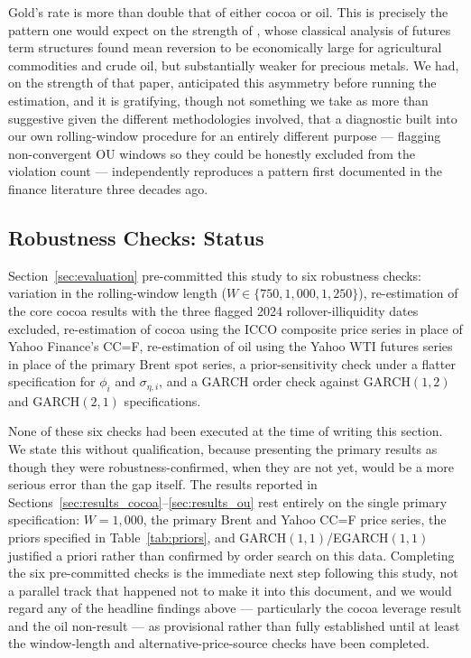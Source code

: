 \documentclass[preprint,12pt,authoryear]{elsarticle}
\begin{document}
Gold's rate is more than double that of either cocoa or oil. This is precisely the pattern one would expect on the strength of \citet{bessembinderetal1995}, whose classical analysis of futures term structures found mean reversion to be economically large for agricultural commodities and crude oil, but substantially weaker for precious metals. We had, on the strength of that paper, anticipated this asymmetry before running the estimation, and it is gratifying, though not something we take as more than suggestive given the different methodologies involved, that a diagnostic built into our own rolling-window procedure for an entirely different purpose --- flagging non-convergent OU windows so they could be honestly excluded from the violation count --- independently reproduces a pattern first documented in the finance literature three decades ago.

\subsection{Robustness Checks: Status}
\label{sec:robustness_status}

Section~\ref{sec:evaluation} pre-committed this study to six robustness checks: variation in the rolling-window length ($W \in \{750, 1{,}000, 1{,}250\}$), re-estimation of the core cocoa results with the three flagged 2024 rollover-illiquidity dates excluded, re-estimation of cocoa using the ICCO composite price series in place of Yahoo Finance's CC=F, re-estimation of oil using the Yahoo WTI futures series in place of the primary Brent spot series, a prior-sensitivity check under a flatter specification for $\phi_i$ and $\sigma_{\eta,i}$, and a GARCH order check against GARCH$(1,2)$ and GARCH$(2,1)$ specifications.

None of these six checks had been executed at the time of writing this section. We state this without qualification, because presenting the primary results as though they were robustness-confirmed, when they are not yet, would be a more serious error than the gap itself. The results reported in Sections~\ref{sec:results_cocoa}--\ref{sec:results_ou} rest entirely on the single primary specification: $W=1{,}000$, the primary Brent and Yahoo CC=F price series, the priors specified in Table~\ref{tab:priors}, and GARCH$(1,1)$/EGARCH$(1,1)$ justified a priori rather than confirmed by order search on this data. Completing the six pre-committed checks is the immediate next step following this study, not a parallel track that happened not to make it into this document, and we would regard any of the headline findings above --- particularly the cocoa leverage result and the oil non-result --- as provisional rather than fully established until at least the window-length and alternative-price-source checks have been completed.
\end{document}
